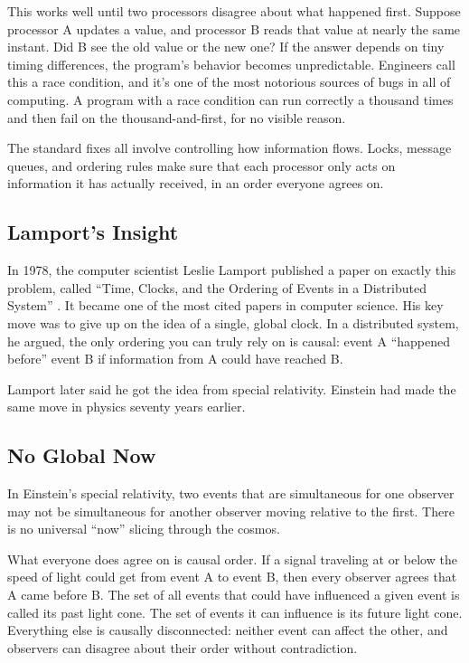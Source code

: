 This works well until two processors disagree about what happened first. Suppose processor A updates a value, and processor B reads that value at nearly the same instant. Did B see the old value or the new one? If the answer depends on tiny timing differences, the program's behavior becomes unpredictable. Engineers call this a race condition, and it's one of the most notorious sources of bugs in all of computing. A program with a race condition can run correctly a thousand times and then fail on the thousand-and-first, for no visible reason.

The standard fixes all involve controlling how information flows. Locks, message queues, and ordering rules make sure that each processor only acts on information it has actually received, in an order everyone agrees on.

\subsection{Lamport's Insight}

In 1978, the computer scientist Leslie Lamport published a paper on exactly this problem, called ``Time, Clocks, and the Ordering of Events in a Distributed System'' \cite{lamport1978}. It became one of the most cited papers in computer science. His key move was to give up on the idea of a single, global clock. In a distributed system, he argued, the only ordering you can truly rely on is causal: event A ``happened before'' event B if information from A could have reached B.

Lamport later said he got the idea from special relativity. Einstein had made the same move in physics seventy years earlier.

\subsection{No Global Now}

In Einstein's special relativity, two events that are simultaneous for one observer may not be simultaneous for another observer moving relative to the first. There is no universal ``now'' slicing through the cosmos.

What everyone does agree on is causal order. If a signal traveling at or below the speed of light could get from event A to event B, then every observer agrees that A came before B. The set of all events that could have influenced a given event is called its past light cone. The set of events it can influence is its future light cone. Everything else is causally disconnected: neither event can affect the other, and observers can disagree about their order without contradiction.

